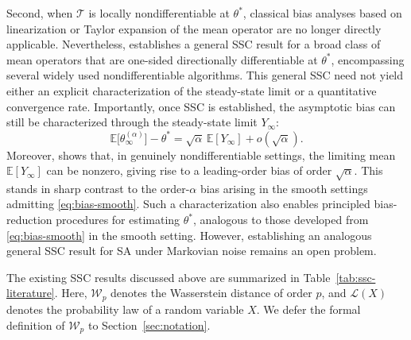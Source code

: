 \documentclass[11pt,letterpaper]{article}
\theoremstyle{plain}
\theoremstyle{definition}
\theoremstyle{remark}
\newcommand{\E}{\mathbb{E}}
\newcommand{\mT}{\mathcal{T}}
\newcommand{\W}{\mathcal{W}}
\newcommand{\law}{\mathcal{L}}
\begin{document}
Second, when \(\mT\) is locally nondifferentiable at \(\theta^*\), classical
bias analyses based on linearization or Taylor expansion of the mean operator
are no longer directly applicable. Nevertheless, \cite{zhang2024prelimit}
establishes a general SSC result for a broad class of mean operators that are
one-sided directionally differentiable at \(\theta^*\), encompassing several
widely used nondifferentiable algorithms. 
This general SSC need not yield either an explicit characterization
of the steady-state limit or a quantitative convergence rate. Importantly, once
SSC is established, the asymptotic bias can still be characterized through
the steady-state limit \(Y_\infty\):
\begin{equation}\label{eq:bias-nonsmooth}
    \E\bigl[\theta_\infty^{(\alpha)}\bigr]-\theta^*
    =
    \sqrt{\alpha}\,\E[Y_\infty]
    +
    o(\sqrt{\alpha}).
\end{equation}
Moreover, \cite{zhang2024prelimit} shows that, in genuinely
nondifferentiable settings, the limiting mean \(\E[Y_\infty]\) can be
nonzero, giving rise to a leading-order bias of order \(\sqrt{\alpha}\).
This stands in sharp contrast to the order-\(\alpha\) bias arising in the
smooth settings admitting \eqref{eq:bias-smooth}. Such a characterization also enables
principled bias-reduction procedures for estimating \(\theta^*\), analogous
to those developed from \eqref{eq:bias-smooth} in the smooth setting.
However, establishing an analogous general SSC result for SA under Markovian
noise remains an open problem.

The existing SSC results discussed above are summarized
in Table~\ref{tab:ssc-literature}. Here, $\W_p$ denotes the Wasserstein
distance of order $p$, and $\law(X)$ denotes the probability law of a random
variable $X$. We defer the formal definition of $\W_p$ to
Section~\ref{sec:notation}.
\end{document}
